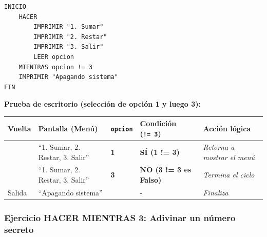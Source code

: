 \begin{verbatim}
INICIO
    HACER
        IMPRIMIR "1. Sumar"
        IMPRIMIR "2. Restar"
        IMPRIMIR "3. Salir"
        LEER opcion
    MIENTRAS opcion != 3
    IMPRIMIR "Apagando sistema"
FIN
\end{verbatim}



\textbf{Prueba de escritorio (selección de opción 1 y luego 3):}

{\def\LTcaptype{none} %
\begin{longtable}[]{@{}
  >{\centering\arraybackslash}p{}
  >{\raggedright\arraybackslash}p{}
  >{\centering\arraybackslash}p{}
  >{\centering\arraybackslash}p{}
  >{\raggedright\arraybackslash}p{}@{}}
\toprule\noalign{}
\begin{minipage}[b]{\linewidth}\centering
Vuelta
\end{minipage} & \begin{minipage}[b]{\linewidth}\raggedright
Pantalla (Menú)
\end{minipage} & \begin{minipage}[b]{\linewidth}\centering
\texttt{opcion}
\end{minipage} & \begin{minipage}[b]{\linewidth}\centering
Condición (\texttt{!=\ 3})
\end{minipage} & \begin{minipage}[b]{\linewidth}\raggedright
Acción lógica
\end{minipage} \\
\midrule\noalign{}
\endhead
\bottomrule\noalign{}
\endlastfoot
1 & ``1. Sumar, 2. Restar, 3. Salir'' & \textbf{1} & \textbf{SÍ (1 !=
3)} & \emph{Retorna a mostrar el menú} \\
2 & ``1. Sumar, 2. Restar, 3. Salir'' & \textbf{3} & \textbf{NO (3 != 3
es Falso)} & \emph{Termina el ciclo} \\
Salida & ``Apagando sistema'' & 3 & - & \emph{Finaliza} \\
\end{longtable}
}

\subsubsection{Ejercicio HACER MIENTRAS 3: Adivinar un número
secreto}\label{ejercicio-hacer-mientras-3-adivinar-un-nuxfamero-secreto}


